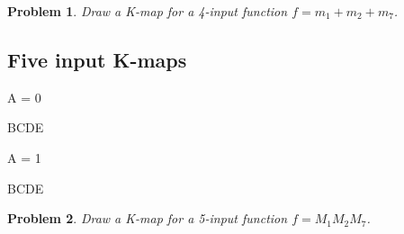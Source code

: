 \documentclass{article}
\newtheorem{prob}{Problem}
\begin{document}
\begin{prob}
  Draw a K-map for a 4-input function $f = m_1 + m_2 + m_7 $.
\end{prob}
\vspace{10em}

\subsection{Five input K-maps}

A = 0
\begin{Karnaugh}{BC}{DE}
\end{Karnaugh} \hfill
A = 1
\begin{Karnaugh}{BC}{DE}
\end{Karnaugh}

\begin{prob}
  Draw a K-map for a 5-input function $f = M_1 M_2 M_7 $.
\end{prob}
\vspace{10em}

%
%
\end{document}
